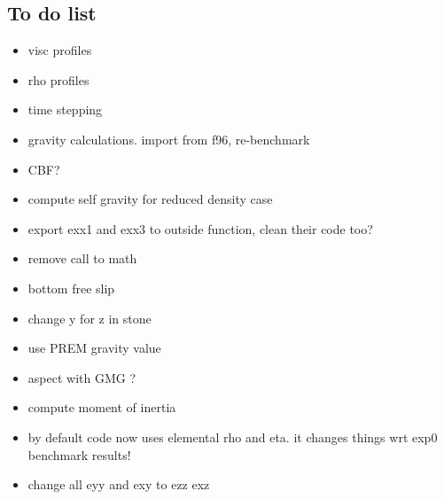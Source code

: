 \documentclass[a4paper,12pt]{article}
\begin{document}
\subsection{To do list}
\begin{itemize}
\item visc profiles
\item rho profiles
\item time stepping
\item gravity calculations. import from f96, re-benchmark
\item CBF? 
\item compute self gravity for reduced density case 
\item export exx1 and exx3 to outside function, clean their code too? 
\item remove call to math 
\item bottom free slip 
\item change y for z in stone
\item use PREM gravity value
\item aspect with GMG ?
\item compute moment of inertia
\item by default code now uses elemental rho and eta. it changes things wrt exp0 benchmark results!
\item change all eyy and exy to ezz exz
\end{itemize}




 
\end{document}
